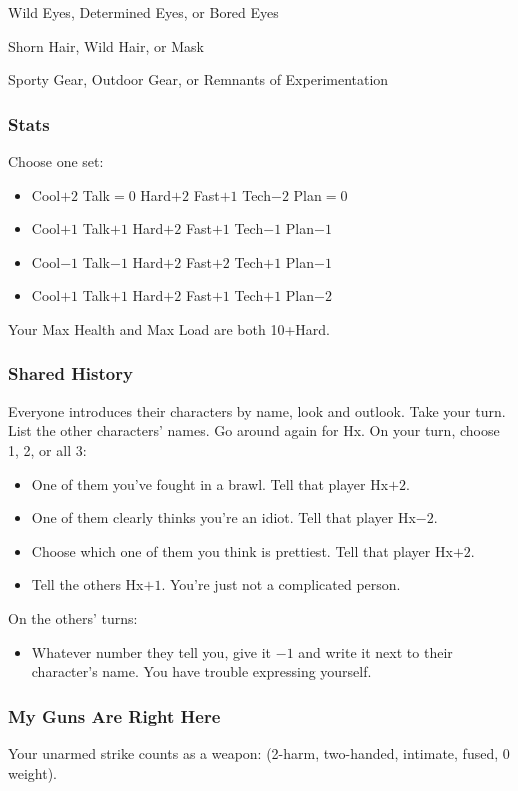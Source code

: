 Wild Eyes, Determined Eyes, or Bored Eyes

Shorn Hair, Wild Hair, or Mask

Sporty Gear, Outdoor Gear, or Remnants of Experimentation

\subsubsection{Stats}
Choose one set:
\begin{itemize}
\setlength\itemsep{0em}
\item Cool$+2$ Talk${=}0$ Hard$+2$ Fast$+1$ Tech$-2$ Plan${=}0$
\item Cool$+1$ Talk$+1$ Hard$+2$ Fast$+1$ Tech$-1$ Plan$-1$
\item Cool$-1$ Talk$-1$ Hard$+2$ Fast$+2$ Tech$+1$ Plan$-1$
\item Cool$+1$ Talk$+1$ Hard$+2$ Fast$+1$ Tech$+1$ Plan$-2$
\end{itemize}

Your Max Health and Max Load are both 10+Hard.

\subsubsection{Shared History}
Everyone introduces their characters by name, look and outlook. Take
your turn.  List the other characters' names.  Go around again for
Hx. On your turn, choose 1, 2, or all 3:
\begin{itemize} %
\item One of them you've fought in a brawl. Tell that player Hx$+2$.
\item One of them clearly thinks you're an idiot. Tell that player Hx$-2$.
\item Choose which one of them you think is prettiest. Tell that player Hx$+2$.
\item Tell the others Hx$+1$. You're just not a complicated person.
\end{itemize}
On the others’ turns:
\begin{itemize} %
\item Whatever number they tell you, give it $-1$ and write it next to
  their character’s name. You have trouble expressing yourself.
\end{itemize}

\subsubsection{My Guns Are Right Here}
Your unarmed strike counts as a weapon: (2-harm, two-handed, intimate, fused, 0 weight).

